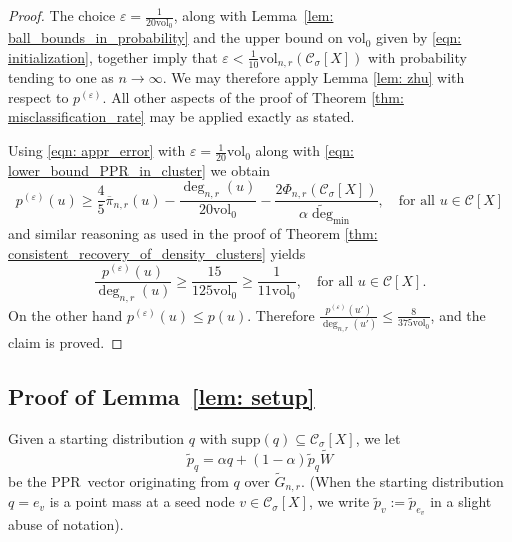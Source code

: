 \documentclass[11pt,twoside]{article}
\newcommand{\vol}{\mathrm{vol}}
\newcommand{\1}{\mathbf{1}}
\newcommand{\pbf}{p}        %
\newcommand{\pibf}{\pi}
\newcommand{\Xbf}{X}             %
\newcommand{\Wbf}{W}
\newcommand{\Cset}{\mathcal{C}}
\newcommand{\Csig}{\Cset_{\sigma}}
\newcommand{\degminwt}{\widetilde{\deg}_{\min}}
\newcommand{\pprspace}{{\sc PPR~}}
\begin{document}
\begin{proof}
The choice $\varepsilon = \frac{1}{20 \vol_0}$, along with Lemma~\ref{lem: ball_bounds_in_probability} and the upper bound on $\vol_0$ given by \eqref{eqn: initialization}, together imply that $\varepsilon < \frac{1}{10}\vol_{n,r}(\Csig[\Xbf])$ with probability tending to one as $n \to \infty$. We may therefore apply Lemma \ref{lem: zhu} with respect to $\pbf^{(\varepsilon)}$. All other aspects of the proof of Theorem \ref{thm: misclassification_rate} may be applied exactly as stated.



Using \eqref{eqn: appr_error} with $\varepsilon = \frac{1}{20}\vol_0$ along with \eqref{eqn: lower_bound_PPR_in_cluster} we obtain
\begin{equation*}
\pbf^{(\varepsilon)}(u) \geq \frac{4}{5} \overline{\pibf}_{n,r}(u) - \frac{\deg_{n,r}(u)}{20\vol_0} - \frac{2\Phi_{n,r}(\Csig[\Xbf])}{\alpha \degminwt}, \quad \textrm{for all $u \in \Cset[\Xbf]$}
\end{equation*}
and similar reasoning as used in the proof of Theorem \ref{thm: consistent_recovery_of_density_clusters} yields
\begin{equation*}
\frac{\pbf^{(\varepsilon)}(u)}{\deg_{n,r}(u)} \geq \frac{15}{125\vol_0} \geq \frac{1}{11 \vol_0}, \quad \textrm{for all $u \in \Cset[\Xbf]$}.
\end{equation*}
On the other hand $\pbf^{(\varepsilon)}(u) \leq \pbf(u)$. Therefore $\frac{\pbf^{(\varepsilon)}(u')}{\deg_{n,r}(u')} \leq \frac{8}{375\vol_0}$, and the claim is proved.

\end{proof}

\subsection{Proof of Lemma~\ref{lem: setup}}
	Given a starting distribution $q$ with $\mathrm{supp}(q) \subseteq \Csig[\Xbf]$, we let
	\begin{equation}
	\widetilde{\pbf}_q = \alpha q + (1 - \alpha) \widetilde{\pbf}_{q} \widetilde{\Wbf}
	\end{equation}
	be the \pprspace vector originating from $q$ over $\widetilde{G}_{n,r}$. (When the starting distribution $q = e_v$ is a point mass at a seed node $v \in \Csig[\Xbf]$, we write $\widetilde{\pbf}_v := \widetilde{\pbf}_{e_v}$ in a slight abuse of notation).
	
\end{document}
